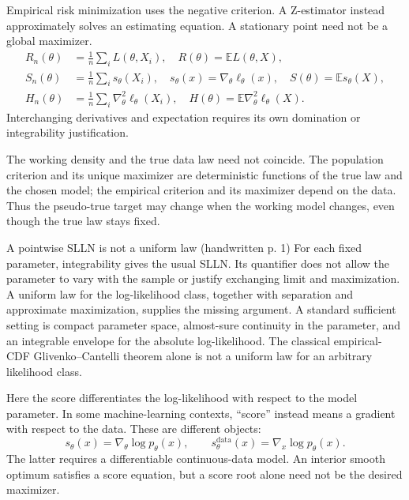 \documentclass[12pt]{article}
\newcommand{\E}{\mathbb E}
\begin{document}
Empirical risk minimization uses the negative criterion. A Z-estimator
instead approximately solves an estimating equation. A stationary point
need not be a global maximizer.
\begin{align}
 R_n(\theta)&=\frac1n\sum_iL(\theta,X_i),\quad R(\theta)=\E L(\theta,X),\\
 S_n(\theta)&=\frac1n\sum_i s_\theta(X_i),\quad
 s_\theta(x)=\nabla_\theta\ell_\theta(x),\quad S(\theta)=\E s_\theta(X),\\
 H_n(\theta)&=\frac1n\sum_i\nabla_\theta^2\ell_\theta(X_i),\quad
 H(\theta)=\E\nabla_\theta^2\ell_\theta(X).
\end{align}
Interchanging derivatives and expectation requires its own domination or
integrability justification.


\begin{remarkbox}
The working density and the true data law need not coincide. The population
criterion and its unique maximizer are deterministic functions of the true
law and the chosen model; the empirical criterion and its maximizer depend
on the data. Thus the pseudo-true target may change when the working model
changes, even though the true law stays fixed.
\end{remarkbox}
\begin{correctionbox}{A pointwise SLLN is not a uniform law (handwritten p. 1)}
For each fixed parameter, integrability gives the usual SLLN. Its quantifier
does not allow the parameter to vary with the sample or justify exchanging
limit and maximization. A uniform law for the log-likelihood class, together
with separation and approximate maximization, supplies the missing argument.
A standard sufficient setting is compact parameter space, almost-sure
continuity in the parameter, and an integrable envelope for the absolute
log-likelihood. The classical empirical-CDF Glivenko--Cantelli theorem
alone is not a uniform law for an arbitrary likelihood class.
\end{correctionbox}
\begin{remarkbox}
Here the score differentiates the log-likelihood with respect to the model
parameter. In some machine-learning contexts, ``score'' instead means a
gradient with respect to the data. These are different objects:
\begin{equation}
 s_\theta(x)=\nabla_\theta\log p_\theta(x),\qquad
 s^{\mathrm{data}}_\theta(x)=\nabla_x\log p_\theta(x).
\end{equation}
The latter requires a differentiable continuous-data model. An interior
smooth optimum satisfies a score equation, but a score root alone need
not be the desired maximizer.
\end{remarkbox}
\end{document}
